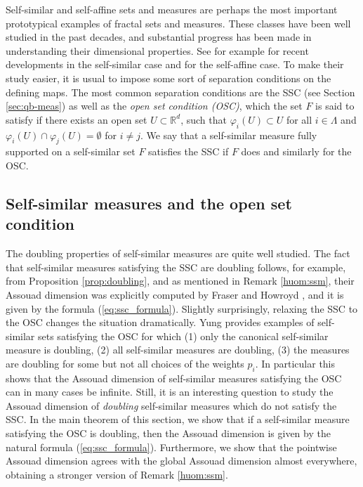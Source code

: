 \documentclass{PRM}
\newcommand{\field}[1]{\mathbb{#1}}
\newcommand{\R}{\field{R}}
\theoremstyle{plain}
\theoremstyle{definition}
\theoremstyle{remark}
\begin{document}
Self-similar and self-affine sets and measures are perhaps the most important prototypical examples of fractal sets and measures. These classes have been well studied in the past decades, and substantial progress has been made in understanding their dimensional properties. See for example \cite{Hoch} for recent developments in the self-similar case and \cite{BHR, HR} for the self-affine case. To make their study easier, it is usual to impose some sort of separation conditions on the defining maps. The most common separation conditions are the SSC (see Section \ref{sec:qb-meas}) as well as the \emph{open set condition (OSC)}, which the set $F$ is said to satisfy if there exists an open set $U\subset \R^d$, such that $\varphi_i(U)\subset U$ for all $i\in\Lambda$ and $\varphi_i(U)\cap \varphi_j(U)=\emptyset$ for $i\ne j$. We say that a self-similar measure fully supported on a self-similar set $F$ satisfies the SSC if $F$ does and similarly for the OSC.

\subsection{Self-similar measures and the open set condition}
The doubling properties of self-similar measures are quite well studied. The fact that self-similar measures satisfying the SSC are doubling follows, for example, from Proposition \ref{prop:doubling}, and as mentioned in Remark \ref{huom:ssm}, their Assouad dimension was explicitly computed by Fraser and Howroyd \cite{FH}, and it is given by the formula (\ref{eq:ssc_formula}). Slightly surprisingly, relaxing the SSC to the OSC changes the situation dramatically. Yung \cite{Yung} provides examples of self-similar sets satisfying the OSC for which (1) only the canonical self-similar measure is doubling, (2) all self-similar measures are doubling, (3) the measures are doubling for some but not all choices of the weights $p_i$. In particular this shows that the Assouad dimension of self-similar measures satisfying the OSC can in many cases be infinite. Still, it is an interesting question to study the Assouad dimension of \emph{doubling} self-similar measures which do not satisfy the SSC. In the main theorem of this section, we show that if a self-similar measure satisfying the OSC is doubling, then the Assouad dimension is given by the natural formula (\ref{eq:ssc_formula}). Furthermore, we show that the pointwise Assouad dimension agrees with the global Assouad dimension almost everywhere, obtaining a stronger version of Remark \ref{huom:ssm}.
\end{document}
